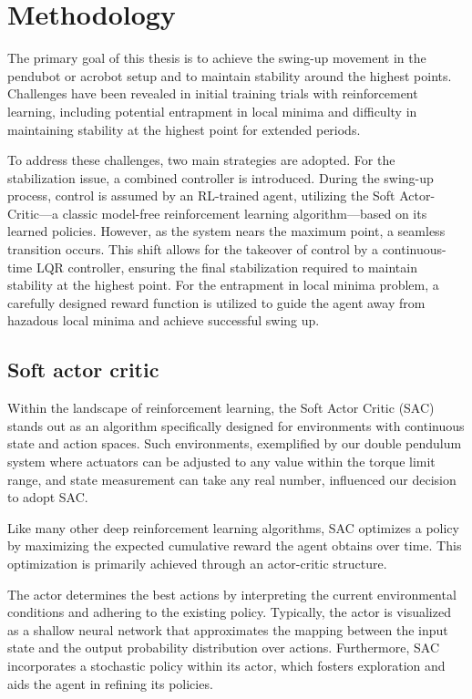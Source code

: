 \chapter{Methodology}
The primary goal of this thesis is to achieve the swing-up movement in the pendubot or acrobot setup and to maintain stability around the highest points. Challenges have been revealed in initial training trials with reinforcement learning, including potential entrapment in local minima and difficulty in maintaining stability at the highest point for extended periods.

To address these challenges, two main strategies are adopted. For the stabilization issue, a combined controller is introduced. During the swing-up process, control is assumed by an RL-trained agent, utilizing the Soft Actor-Critic—a classic model-free reinforcement learning algorithm—based on its learned policies. However, as the system nears the maximum point, a seamless transition occurs. This shift allows for the takeover of control by a continuous-time LQR controller, ensuring the final stabilization required to maintain stability at the highest point. For the entrapment in local minima problem, a carefully designed reward function is utilized to guide the agent away from hazadous local minima and achieve successful swing up.

\section{Soft actor critic}
Within the landscape of reinforcement learning, the Soft Actor Critic (SAC)\cite{haarnoja2018soft} stands out as an algorithm specifically designed for environments with continuous state and action spaces. Such environments, exemplified by our double pendulum system where actuators can be adjusted to any value within the torque limit range, and state measurement can take any real number, influenced our decision to adopt SAC.

Like many other deep reinforcement learning algorithms, SAC optimizes a policy by maximizing the expected cumulative reward the agent obtains over time. This optimization is primarily achieved through an actor-critic structure\cite{konda1999actor}.

The actor determines the best actions by interpreting the current environmental conditions and adhering to the existing policy. Typically, the actor is visualized as a shallow neural network that approximates the mapping between the input state and the output probability distribution over actions. Furthermore, SAC incorporates a stochastic policy within its actor, which fosters exploration and aids the agent in refining its policies.

